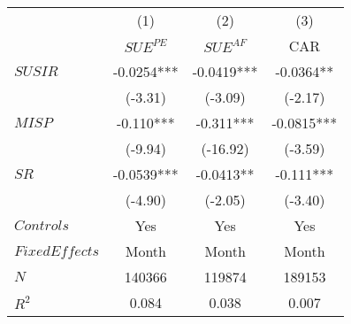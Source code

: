 \begin{tabular}{lccc}
        &         &         &  \bigstrut[b]\\
\hline
        & (1)     & (2)     & (3) \bigstrut[t]\\
        & $SUE^{PE}$ & $SUE^{AF}$ & CAR \bigstrut[b]\\
\hline
\rowcolor[rgb]{ .769,  .843,  .608}   $SUSIR$ & -0.0254*** & -0.0419*** & -0.0364** \bigstrut[t]\\
\rowcolor[rgb]{ .769,  .843,  .608}           & (-3.31) & (-3.09) & (-2.17) \\
$MISP$  & -0.110*** & -0.311*** & -0.0815*** \\
        & (-9.94) & (-16.92) & (-3.59) \\
$SR$    & -0.0539*** & -0.0413** & -0.111*** \\
        & (-4.90) & (-2.05) & (-3.40) \\
\hline
$Controls$ & Yes   & Yes   & Yes \\
$Fixed Effects$ & Month   & Month   & Month \bigstrut[t]\\
$N$     & 140366  & 119874  & 189153 \\
$R^2$   & 0.084   & 0.038   & 0.007 \bigstrut[b]\\
\hline
\end{tabular}%
